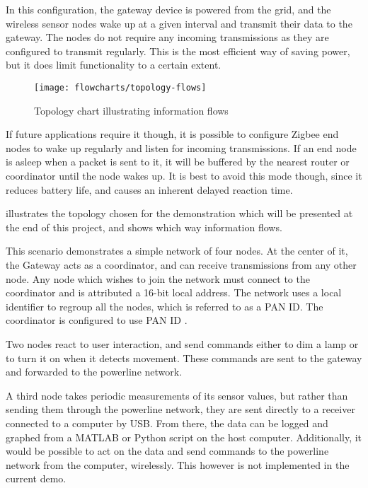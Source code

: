 In this configuration, the gateway device is powered from the grid, and the
wireless sensor nodes wake up at a given interval and transmit their data to the
gateway. The nodes do not require any incoming transmissions as they are
configured to transmit regularly. This is the most efficient way of saving
power, but it does limit functionality to a certain extent.

\begin{figure}[h]
  \begin{center}
    \texttt{[image: flowcharts/topology-flows]}
  \end{center}
  \caption{Topology chart illustrating information flows}
  \label{fig:topology-flows}
\end{figure}

If future applications require it though, it is possible to configure Zigbee end
nodes to wake up regularly and listen for incoming transmissions. If an end node
is asleep when a packet is sent to it, it will be buffered by the nearest router
or coordinator until the node wakes up. It is best to avoid this mode though,
since it reduces battery life, and causes an inherent delayed reaction time.

 illustrates the topology chosen for the demonstration
which will be presented at the end of this project, and shows which way
information flows. 


This scenario demonstrates a simple network of four nodes. At the center of it,
the Gateway acts as a coordinator, and can receive transmissions from any other
node. Any node which wishes to join the network must connect to the coordinator
and is attributed a 16-bit local address. The network uses a local identifier to
regroup all the nodes, which is referred to as a PAN ID. The coordinator is
configured to use PAN ID .

Two nodes react to user interaction, and send commands either to dim a lamp or
to turn it on when it detects movement. These commands are sent to the gateway
and forwarded to the powerline network.

A third node takes periodic measurements of its sensor values, but rather than
sending them through the powerline network, they are sent directly to a receiver
connected to a computer by USB. From there, the data can be logged and graphed
from a MATLAB or Python script on the host computer. Additionally, it would be
possible to act on the data and send commands to the powerline network from the
computer, wirelessly. This however is not implemented in the current demo.


